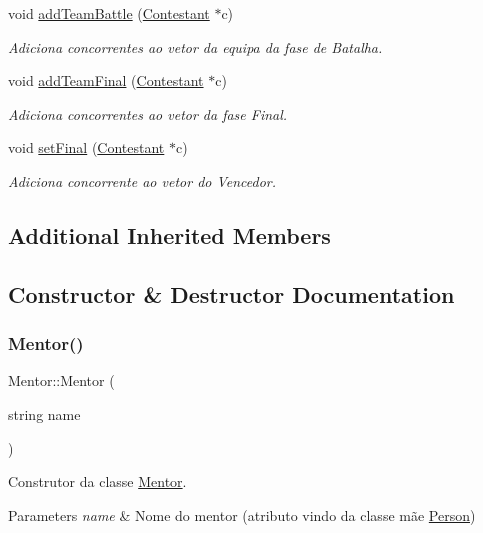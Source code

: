 \begin{DoxyCompactItemize}
void \hyperlink{class_mentor_a4b128fd072058b9c6255ef3984f79ddd}{add\+Team\+Battle} (\hyperlink{class_contestant}{Contestant} $\ast$c)
\begin{DoxyCompactList}\small\item\em Adiciona concorrentes ao vetor da equipa da fase de Batalha. \end{DoxyCompactList}\item 
void \hyperlink{class_mentor_a4e7d9c4b52211737d6135516d569ac52}{add\+Team\+Final} (\hyperlink{class_contestant}{Contestant} $\ast$c)
\begin{DoxyCompactList}\small\item\em Adiciona concorrentes ao vetor da fase Final. \end{DoxyCompactList}\item 
void \hyperlink{class_mentor_a07a8359f559b44a2fac24726f19e6dfb}{set\+Final} (\hyperlink{class_contestant}{Contestant} $\ast$c)
\begin{DoxyCompactList}\small\item\em Adiciona concorrente ao vetor do Vencedor. \end{DoxyCompactList}\end{DoxyCompactItemize}
\subsection*{Additional Inherited Members}


\subsection{Constructor \& Destructor Documentation}
\hypertarget{class_mentor_aaeadeaf5fc979243907d643c5f6d0724}{}\label{class_mentor_aaeadeaf5fc979243907d643c5f6d0724} 
\subsubsection{\texorpdfstring{Mentor()}{Mentor()}}
{\footnotesize\ttfamily Mentor\+::\+Mentor (\begin{DoxyParamCaption}\item[{string}]{name }\end{DoxyParamCaption})}



Construtor da classe \hyperlink{class_mentor}{Mentor}. 


\begin{DoxyParams}{Parameters}
{\em name} & Nome do mentor (atributo vindo da classe mãe \hyperlink{class_person}{Person}) \\
\hline
\end{DoxyParams}


